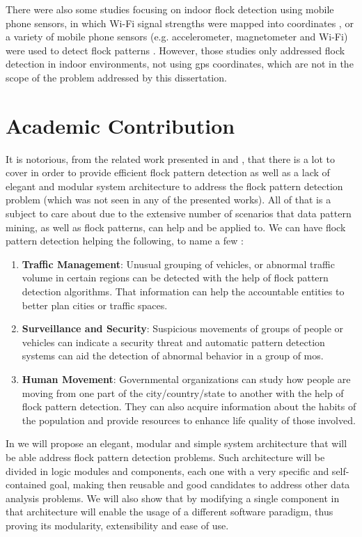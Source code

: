 There were also some studies focusing on indoor flock detection using mobile phone sensors, in which Wi-Fi signal
strengths were mapped into coordinates \citep{mobile1}, or a variety of mobile phone sensors (e.g. accelerometer,
magnetometer and Wi-Fi) were used to detect flock patterns \citep{mobile2}. However, those studies only addressed flock
detection in indoor environments, not using \ac{gps} coordinates, which are not in the scope of the problem addressed by
this dissertation.

\section{Academic Contribution}
It is notorious, from the related work presented in  and , that there is
a lot to cover in order to provide efficient flock pattern detection as well as a lack of elegant and modular system
architecture to address the flock pattern detection problem (which was not seen in any of the presented works). All of
that is a subject to care about due to the extensive number of scenarios that data pattern mining, as well as flock
patterns, can help and be applied to. We can have flock pattern detection helping the following, to name a few
\citep{applications}:

\begin{enumerate}
    \item \textbf{Traffic Management}: Unusual grouping of vehicles, or abnormal traffic volume in certain regions can
        be detected with the help of flock pattern detection algorithms. That information can help the accountable
        entities to better plan cities or traffic spaces.
    \item \textbf{Surveillance and Security}: Suspicious movements of groups of people or vehicles can indicate a
        security threat and automatic pattern detection systems can aid the detection of abnormal behavior in a group of
        \acp{mo}.
    \item \textbf{Human Movement}: Governmental organizations can study how people are moving from one part of the
        city/country/state to another with the help of flock pattern detection. They can also acquire information about
        the habits of the population and provide resources to enhance life quality of those involved.
\end{enumerate}

In  we will propose an elegant, modular and simple system architecture that will be able
address flock pattern detection problems. Such architecture will be divided in logic modules and components, each one
with a very specific and self-contained goal, making then reusable and good candidates to address other data analysis
problems. We will also show that by modifying a single component in that architecture will enable the usage of a
different software paradigm, thus proving its modularity, extensibility and ease of use.

